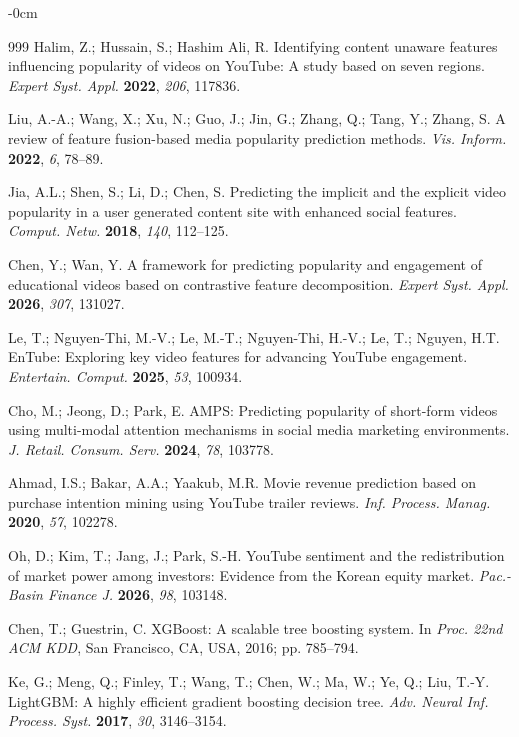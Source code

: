 \documentclass[journal,article,submit,pdftex,moreauthors]{Definitions/mdpi}
\begin{document}
\begin{adjustwidth}{-\extralength}{0cm}
\begin{thebibliography}{999}
Halim, Z.; Hussain, S.; Hashim Ali, R. Identifying content unaware features
influencing popularity of videos on YouTube: A study based on seven regions.
{\em Expert Syst. Appl.} {\bf 2022}, {\em 206}, 117836.

Liu, A.-A.; Wang, X.; Xu, N.; Guo, J.; Jin, G.; Zhang, Q.; Tang, Y.;
Zhang, S. A review of feature fusion-based media popularity prediction
methods. {\em Vis. Inform.} {\bf 2022}, {\em 6}, 78--89.

Jia, A.L.; Shen, S.; Li, D.; Chen, S. Predicting the implicit and the
explicit video popularity in a user generated content site with enhanced
social features. {\em Comput. Netw.} {\bf 2018}, {\em 140}, 112--125.

Chen, Y.; Wan, Y. A framework for predicting popularity and engagement of
educational videos based on contrastive feature decomposition.
{\em Expert Syst. Appl.} {\bf 2026}, {\em 307}, 131027.

Le, T.; Nguyen-Thi, M.-V.; Le, M.-T.; Nguyen-Thi, H.-V.; Le, T.;
Nguyen, H.T. EnTube: Exploring key video features for advancing YouTube
engagement. {\em Entertain. Comput.} {\bf 2025}, {\em 53}, 100934.

Cho, M.; Jeong, D.; Park, E. AMPS: Predicting popularity of short-form
videos using multi-modal attention mechanisms in social media marketing
environments. {\em J. Retail. Consum. Serv.} {\bf 2024}, {\em 78},
103778.

Ahmad, I.S.; Bakar, A.A.; Yaakub, M.R. Movie revenue prediction based on
purchase intention mining using YouTube trailer reviews.
{\em Inf. Process. Manag.} {\bf 2020}, {\em 57}, 102278.

Oh, D.; Kim, T.; Jang, J.; Park, S.-H. YouTube sentiment and the
redistribution of market power among investors: Evidence from the Korean
equity market. {\em Pac.-Basin Finance J.} {\bf 2026}, {\em 98}, 103148.

Chen, T.; Guestrin, C. XGBoost: A scalable tree boosting system.
In {\em Proc. 22nd ACM KDD}, San Francisco, CA, USA, 2016; pp. 785--794.

Ke, G.; Meng, Q.; Finley, T.; Wang, T.; Chen, W.; Ma, W.; Ye, Q.;
Liu, T.-Y. LightGBM: A highly efficient gradient boosting decision tree.
{\em Adv. Neural Inf. Process. Syst.} {\bf 2017}, {\em 30}, 3146--3154.


\end{thebibliography}
\end{adjustwidth}
\end{document}
